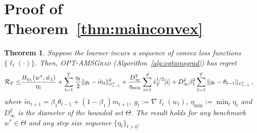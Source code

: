 \documentclass[twoside]{article}
\newtheorem*{Theorem*}{Theorem}
\begin{document}



\clearpage

\onecolumn
\appendix


\section{Proof of Theorem~\ref{thm:mainconvex}}\label{app:thmmainconvex}
\begin{Theorem*}
Suppose the learner incurs a sequence of convex loss functions $\{ \ell_{t}(\cdot) \}$.
Then,  \textsc{OPT-AMSGrad} (Algorithm~\ref{alg:optamsgrad}) has regret 
\begin{equation}\notag
\begin{aligned}
\mathcal{R}_T \leq &   \frac{ B_{\psi_1}(w^*, \tilde{w}_{1})}{\eta_1}
+ \sum_{t=1}^T\frac{\eta_t}{2} \| g_t - \tilde{m}_t  \|_{\psi_{t-1}^*}^2  + \frac{D_{\infty}^2}{\eta_{\min}}  \sum_{i=1}^d \hat{v}_{T}^{1/2}[i] + D_{\infty}^2\beta_1^2   \sum_{t=1}^T  \| g_t - \theta_{t-1}  \|_{\psi_{t-1}^*}\;,
\end{aligned}
\end{equation}
where $ \tilde{m}_{t+1}  = \beta_1 \theta_{t-1} +(1-\beta_1) m_{t+1}$, $g_{t}:= \nabla \ell_{t}(w_t)$, $\eta_{{\min}} := \min_{{t}} \eta_{t}$ and $D_{\infty}^2$ is the diameter of the bounded set $\Theta$.
The result holds for any benchmark $w^{*} \in \Theta$ and any step size sequence $\{ \eta_t \}_{t>0}$.
\end{Theorem*}
\end{document}
